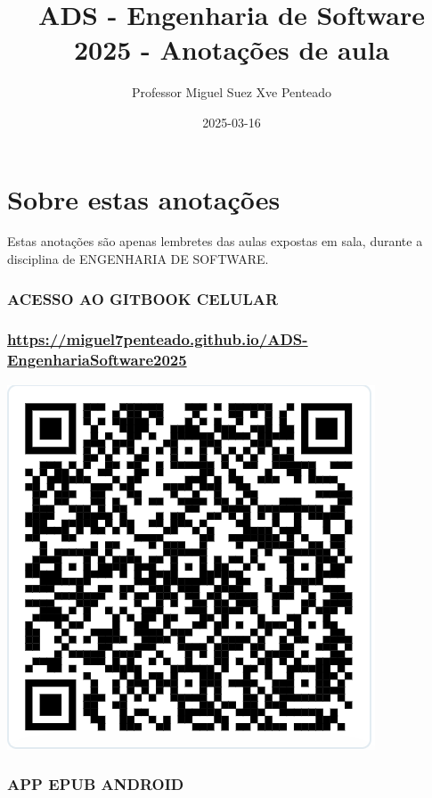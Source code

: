 \documentclass[
]{book}
\title{ADS - Engenharia de Software 2025 - Anotações de aula}
\author{Professor Miguel Suez Xve Penteado}
\date{2025-03-16}
\begin{document}
\maketitle

{
\setcounter{tocdepth}{1}
\tableofcontents
}
\chapter*{Sobre estas anotações}\label{sobre-estas-anotauxe7uxf5es}

Estas anotações são apenas lembretes das aulas expostas em sala, durante a disciplina de ENGENHARIA DE SOFTWARE.

\subsection{ACESSO AO GITBOOK CELULAR}\label{acesso-ao-gitbook-celular}

\subsection{\texorpdfstring{\url{https://miguel7penteado.github.io/ADS-EngenhariaSoftware2025}}{https://miguel7penteado.github.io/ADS-EngenhariaSoftware2025}}\label{httpsmiguel7penteado.github.ioads-engenhariasoftware2025}

\includegraphics{images/clipboard-3692082511.png}

\subsection{APP EPUB ANDROID}\label{app-epub-android}
\end{document}
